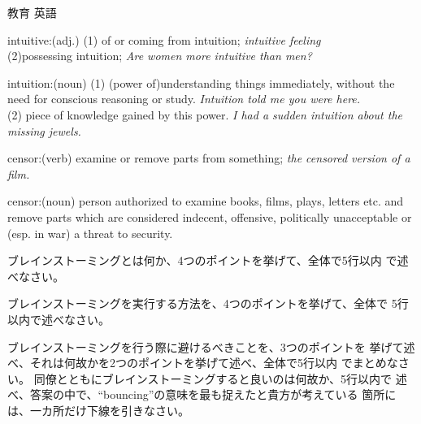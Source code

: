 \documentclass[fleqn]{jbook}
\begin{document}
\begin{question}{教育 英語}{}
\begin{subquestions}
\begin{list}{}{\itemindent=0mm  \leftmargin=28mm
\topsep=0mm \itemsep=0mm \parsep=0mm}
\item[intuitive:(adj.)\hfill]
(1) of or coming from intuition;
{\it intuitive feeling}\\
(2)possessing intuition;
{\it Are women more intuitive than men?}

\item[intuition:(noun)\hfill]
(1) (power of)understanding things immediately, without the need for
conscious reasoning or study.
{\it Intuition told me you were here.}\\
(2) piece of knowledge gained by this power.
{\it I had a sudden intuition about the missing jewels.}

\item[censor:(verb)\hfill]
examine or remove parts from something;
{\it the censored version of a film.}

\item[censor:(noun)\hfill]
person authorized to examine books, films, plays, letters etc.
and remove parts which are considered indecent, offensive,
politically unacceptable or (esp. in  war) a threat to security.
\end{list}


\baselineskip=15pt
  \begin{subsubquestions}
  \SubSubQuestion
    ブレインストーミングとは何か、4つのポイントを挙げて、全体で5行以内
    で述べなさい。

  \SubSubQuestion
    ブレインストーミングを実行する方法を、4つのポイントを挙げて、全体で
    5行以内で述べなさい。

  \SubSubQuestion
    ブレインストーミングを行う際に避けるべきことを、3つのポイントを
    挙げて述べ、それは何故かを2つのポイントを挙げて述べ、全体で5行以内
    でまとめなさい。
  \SubSubQuestion
    同僚とともにブレインストーミングすると良いのは何故か、5行以内で
    述べ、答案の中で、``bouncing''の意味を最も捉えたと貴方が考えている
    箇所には、一カ所だけ下線を引きなさい。

  \end{subsubquestions}


\end{subquestions}
\end{question}
\end{document}
